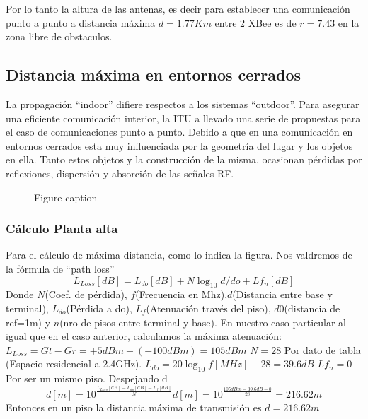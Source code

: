 \documentclass[11pt,oneside,spanish,a4paper]{article}
\begin{document}
Por lo tanto la altura de las antenas, es decir para establecer una comunicaci\'on punto a punto a distancia m\'axima $d=1.77Km$ entre 2 XBee es de $r=7.43$ en la zona libre de obstaculos.

\subsection{Distancia m\'axima en entornos cerrados}

La propagaci\'on ``indoor'' difiere respectos a los sistemas ``outdoor''. Para asegurar una eficiente comunicaci\'on interior, la ITU a llevado una serie de propuestas para el caso de comunicaciones punto a punto. Debido a que en una comunicaci\'on en entornos cerrados esta muy influenciada por la geometr\'ia del lugar y los objetos en ella. Tanto estos objetos y la construcci\'on de la misma, ocasionan p\'erdidas por reflexiones, dispersi\'on y absorci\'on de las se\~nales RF.  

\begin{figure}[h]
\caption{Figure caption}
\end{figure}

\subsubsection{C\'alculo Planta alta}
Para el c\'alculo de m\'axima distancia, como lo indica la figura. Nos valdremos de la f\'ormula de ``path loss''
\begin{equation*}
\label{eq:pathLoss}
L_{Loss}[dB] = L_{do}[dB] + N \log_{10}d/do + Lf_{n}[dB]
\end{equation*}
Donde $N$(Coef. de p\'erdida), $f$(Frecuencia en Mhz),$d$(Distancia entre base y terminal), $L_{do}$(P\'erdida a do), $L_{f}$(Atenuaci\'on trav\'es del piso), $d0$(distancia de ref=1m) y $n$(nro de pisos entre terminal y base).
En nuestro caso particular al igual que en el caso anterior, calculamos la m\'axima atenuaci\'on:
$L_{Loss}= Gt - Gr = +5dBm - (-100dBm) = 105dBm$
$N=28$ Por dato de tabla (Espacio residencial a 2.4GHz).
$L_{do} = 20 \log_{10}f[MHz] - 28 = 39.6dB$
$Lf_{n} = 0$ Por ser un mismo piso.
Despejando d
\begin{equation*}
\label{eq:calculod}
d[m] = 10 ^{\frac{L_{Loss}[dB] - L_{do}[dB] - L_{f}[dB]}{N}} 
d[m] = 10 ^{\frac{105dBm - 39.6dB - 0}{28}} = 216.62m
\end{equation*}
Entonces en un piso la distancia m\'axima de transmisi\'on es $d=216.62m$
\end{document}
